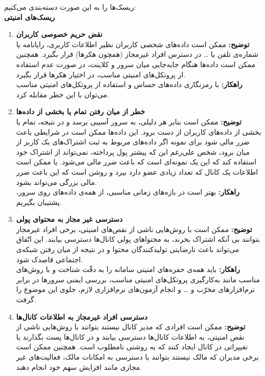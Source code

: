 ریسک‌ها را به این صورت دسته‌بندی  می‌کنیم:\\
\large \textbf{ریسک‌های امنیتی}
\begin{enumerate}[start = 1]
    \item \textbf{نقض حریم خصوصی کاربران}
       \\\textbf{توضیح: }
        ممکن است داده‌های شخصی کاربران نظیر اطلاعات کاربری، رایانامه یا شماره‌ی تلفن یا  … در دسترس افراد غیرمجاز (همچون هکرها) قرار بگیرد. همچنین ممکن است داده‌ها هنگام جابه‌جایی میان سرور و کلاینت، در صورت عدم استفاده از پروتکل‌های امنیتی مناسب، در اختیار هکرها قرار بگیرد.
       \\\textbf{راهکار: }
        با رمزنگاری داده‌های حساس و استفاده از پروتکل‌های  امنیتی مناسب می‌توان با این خطر مقابله کرد.
    \item \textbf{خطر از میان رفتن تمام یا بخشی از داده‌ها}
       \\\textbf{توضیح: }
        ممکن است بنابر هر دلیلی، به سرور آسیبی برسد و در نتیجه، تمام یا بخشی از داده‌های کاربران از دست برود. این داده‌ها ممکن است در شرایطی باعث ضرر مالی شود برای نمونه اگر داده‌های مربوط به ثبت اشتراک‌‌های  یک کاربر از میان برود، شخص علی‌رغم این که پیشتر پول پرداخته،‌ نمی‌تواند از اشتراک خود استفاده کند که این یک نمونه‌ای است که باعث ضرر مالی می‌شود. یا ممکن است اطلاعات یک کانال که تعداد زیادی عضو دارد بپرد و روشن است که این باعث ضرر مالی بزرگی می‌تواند بشود.
       \\\textbf{راهکار: }
        بهتر است در بازه‌های زمانی مناسبی، از همه‌ی داده‌های روی سرور، پشتیبان بگیریم.
    \item \textbf{دسترسی غیر مجاز به محتوای پولی}
       \\\textbf{توضیح: }
        ممکن است با روش‌هایی ناشی از نقص‌های امنیتی، برخی افراد غیرمجاز بتوانند بی آنکه اشتراک بخرند، به محتواهای پولی کانال‌ها دسترسی بیابند. این اتّفاق می‌تواند باعث نارضایتی تولیدکنندگان محتوا و در نتیجه از میان رفتن شبکه‌ی اجتماعی قاصدک شود.
       \\\textbf{راهکار: }
        باید همه‌ی حفره‌های  امنیتی سامانه را به دقّت شناخت و با روش‌های مناسب مانند به‌کارگیری پروتکل‌های امنیتی مناسب، بررسی ایمنی سرورها در برابر نرم‌افزارهای مخرّب و … و انجام آزمون‌های نرم‌افزاری لازم، جلوی این موضوع را گرفت.
    \item \textbf{دسترسی  افراد غیرمجاز به اطلاعات کانال‌ها}
       \\\textbf{توضیح: }
        ممکن است افرادی که مدیر کانال نیستند بتوانند با روش‌هایی ناشی از نقص امنیتی، به اطلاعات کانال‌ها دسترسی بیابند و در کانال‌ها پست بگذارند یا تغییراتی در کانال ایجاد کنند که به روشنی نامطلوب است. همچنین ممکن است برخی مدیران که مالک نیستند بتوانند با دسترسی به امکانات مالک، فعالیت‌های غیر مجازی مانند افزایش سهم خود انجام دهند.

\end{enumerate}
